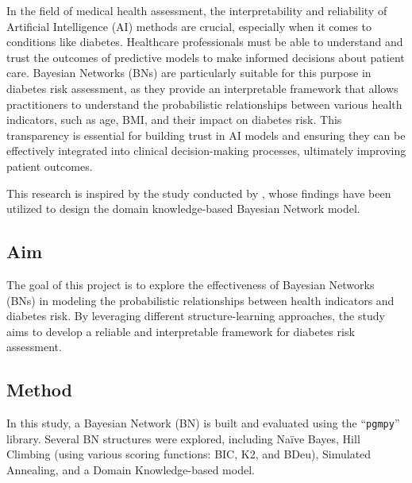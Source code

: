 \documentclass[letterpaper]{article}
\begin{document}
In the field of medical health assessment, the interpretability and reliability of Artificial Intelligence (AI) methods are crucial, especially when it comes to conditions like diabetes. Healthcare professionals must be able to understand and trust the outcomes of predictive models to make informed decisions about patient care. Bayesian Networks (BNs) are particularly suitable for this purpose in diabetes risk assessment, as they provide an interpretable framework that allows practitioners to understand the probabilistic relationships between various health indicators, such as age, BMI, and their impact on diabetes risk. This transparency is essential for building trust in AI models and ensuring they can be effectively integrated into clinical decision-making processes, ultimately improving patient outcomes.

This research is inspired by the study conducted by \citet{kong2024}, whose findings have been utilized to design the domain knowledge-based Bayesian Network model.

\subsection{Aim}

The goal of this project is to explore the effectiveness of Bayesian Networks (BNs) in modeling the probabilistic relationships between health indicators and diabetes risk. By leveraging different structure-learning approaches, the study aims to develop a reliable and interpretable framework for diabetes risk assessment.

\subsection{Method} 

In this study, a Bayesian Network (BN) is built and evaluated using the ``\texttt{pgmpy}'' library. Several BN structures were explored, including Naïve Bayes, Hill Climbing (using various scoring functions: BIC, K2, and BDeu), Simulated Annealing, and a Domain Knowledge-based model.  

\end{document}
